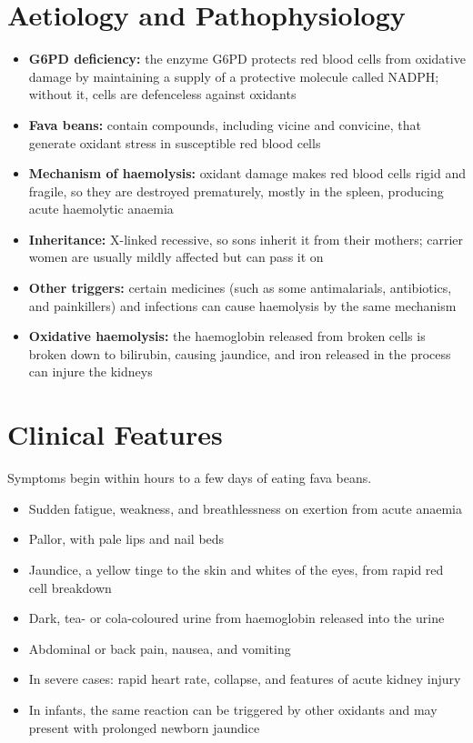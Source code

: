 \section*{Aetiology and Pathophysiology}
\begin{itemize}
    \item \textbf{G6PD deficiency:} the enzyme G6PD protects red blood cells from oxidative damage by maintaining a supply of a protective molecule called NADPH; without it, cells are defenceless against oxidants
    \item \textbf{Fava beans:} contain compounds, including vicine and convicine, that generate oxidant stress in susceptible red blood cells
    \item \textbf{Mechanism of haemolysis:} oxidant damage makes red blood cells rigid and fragile, so they are destroyed prematurely, mostly in the spleen, producing acute haemolytic anaemia
    \item \textbf{Inheritance:} X-linked recessive, so sons inherit it from their mothers; carrier women are usually mildly affected but can pass it on
    \item \textbf{Other triggers:} certain medicines (such as some antimalarials, antibiotics, and painkillers) and infections can cause haemolysis by the same mechanism
    \item \textbf{Oxidative haemolysis:} the haemoglobin released from broken cells is broken down to bilirubin, causing jaundice, and iron released in the process can injure the kidneys
\end{itemize}

\section*{Clinical Features}
Symptoms begin within hours to a few days of eating fava beans.
\begin{itemize}
    \item Sudden fatigue, weakness, and breathlessness on exertion from acute anaemia
    \item Pallor, with pale lips and nail beds
    \item Jaundice, a yellow tinge to the skin and whites of the eyes, from rapid red cell breakdown
    \item Dark, tea- or cola-coloured urine from haemoglobin released into the urine
    \item Abdominal or back pain, nausea, and vomiting
    \item In severe cases: rapid heart rate, collapse, and features of acute kidney injury
    \item In infants, the same reaction can be triggered by other oxidants and may present with prolonged newborn jaundice
\end{itemize}

